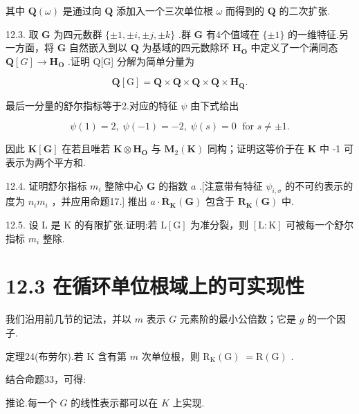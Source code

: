 \documentclass[10pt]{article}
\begin{document}
其中 \(\mathbf{Q}\left( \omega \right)\) 是通过向 \(\mathbf{Q}\) 添加入一个三次单位根 \(\omega\) 而得到的 \(\mathbf{Q}\) 的二次扩张.

12.3. 取 \(\mathbf{G}\) 为四元数群 \(\{  \pm  1, \pm  i, \pm  j, \pm  k\}\) .群 \(\mathbf{G}\) 有4个值域在 \(\{  \pm  1\}\) 的一维特征.另一方面，将 \(\mathbf{G}\) 自然嵌入到以 \(\mathbf{Q}\) 为基域的四元数除环 \({\mathbf{H}}_{\mathbf{O}}\) 中定义了一个满同态 \(\mathbf{Q}\left\lbrack  G\right\rbrack   \rightarrow  {\mathbf{H}}_{\mathbf{O}}\) .证明 Q[G] 分解为简单分量为

\[
\mathbf{Q}\left\lbrack  \mathrm{G}\right\rbrack   = \mathbf{Q} \times  \mathbf{Q} \times  \mathbf{Q} \times  \mathbf{Q} \times  {\mathbf{H}}_{\mathbf{Q}}.
\]

最后一分量的舒尔指标等于2.对应的特征 \(\psi\) 由下式给出

\[
\psi \left( 1\right)  = 2,\;\psi \left( {-1}\right)  =  - 2,\;\psi \left( s\right)  = 0\;\text{ for }s \neq   \pm  1.
\]

因此 \(\mathbf{K}\left\lbrack  \mathbf{G}\right\rbrack\) 在若且唯若 \(\mathbf{K} \otimes  {\mathbf{H}}_{\mathbf{O}}\) 与 \({\mathbf{M}}_{2}\left( \mathbf{K}\right)\) 同构；证明这等价于在 \(\mathbf{K}\) 中 -1 可表示为两个平方和.

12.4. 证明舒尔指标 \({m}_{i}\) 整除中心 \(\mathbf{G}\) 的指数 \(a\) .[注意带有特征 \({\psi }_{i,\sigma }\) 的不可约表示的度为 \({n}_{i}{m}_{i}\) ，并应用命题17.] 推出 \(a \cdot  {\overline{\mathbf{R}}}_{\mathbf{K}}\left( \mathbf{G}\right)\) 包含于 \({\mathbf{R}}_{\mathbf{K}}\left( \mathbf{G}\right)\) 中.

12.5. 设 \(\mathrm{L}\) 是 \(\mathrm{K}\) 的有限扩张.证明:若 \(\mathrm{L}\left\lbrack  \mathrm{G}\right\rbrack\) 为准分裂，则 \(\left\lbrack  {\mathrm{L} : \mathrm{K}}\right\rbrack\) 可被每一个舒尔指标 \({m}_{i}\) 整除.

\section*{12.3 在循环单位根域上的可实现性}

我们沿用前几节的记法，并以 \(m\) 表示 \(G\) 元素阶的最小公倍数；它是 \(g\) 的一个因子.

定理24(布劳尔).若 \(\mathrm{K}\) 含有第 \(m\) 次单位根，则 \({\mathrm{R}}_{\mathrm{K}}\left( \mathrm{G}\right) \; = \mathrm{R}\left( \mathrm{G}\right)\) .

结合命题33，可得:

推论.每一个 \(G\) 的线性表示都可以在 \(K\) 上实现.
\end{document}
